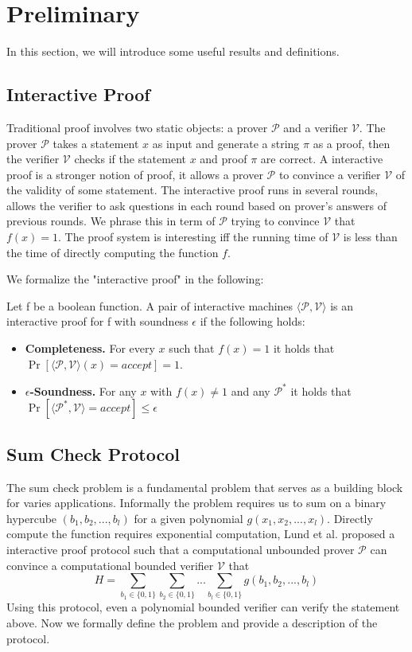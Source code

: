 \section{Preliminary}
In this section, we will introduce some useful results and definitions.
\subsection{Interactive Proof}
Traditional proof involves two static objects: a prover $\mathcal{P}$ and a verifier $\mathcal{V}$. The prover $\mathcal{P}$ takes a statement $x$ as input and generate a string $\pi$ as a proof, then the verifier $\mathcal{V}$ checks if the statement $x$ and proof $\pi$ are correct. A interactive proof is a stronger notion of proof, it allows a prover $\mathcal{P}$ to convince a verifier $\mathcal{V}$ of the validity of some statement. The interactive proof runs in several rounds, allows the verifier to ask questions in each round based on prover's answers of previous rounds. We phrase this in term of $\mathcal{P}$ trying to convince $\mathcal{V}$ that $f(x)=1$. The proof system is interesting iff the running time of $\mathcal{V}$ is less than the time of directly computing the function $f$.

We formalize the "interactive proof" in the following:	
\begin{definition}
	Let f be a boolean function. A pair of interactive machines $\langle\mathcal{P}, \mathcal{V}\rangle$ is an interactive proof for f with soundness $\epsilon$ if the following holds:
	\begin{itemize}
		\item {\bf Completeness.} For every $x$ such that $f(x) = 1$ it holds that $\Pr[\langle\mathcal{P}, \mathcal{V}\rangle(x)=accept]=1$.
		\item {\bf $\epsilon$-Soundness.} For any $x$ with $f(x) \neq 1$ and any $\mathcal{P}^*$ it holds that $\Pr[\langle\mathcal{P^*},\mathcal{V}\rangle=accept] \le \epsilon$
	\end{itemize}
\end{definition}

\subsection{Sum Check Protocol}
The sum check problem is a fundamental problem that serves as a building block for varies applications. Informally the problem requires us to sum on a binary hypercube $(b_1, b_2, ..., b_{l})$ for a given polynomial $g(x_1, x_2, ..., x_{l})$. Directly compute the function requires exponential computation, Lund et al.\cite{sumcheck} proposed a interactive proof protocol such that a computational unbounded prover $\mathcal{P}$ can convince a computational bounded verifier $\mathcal{V}$ that $$H=\sum_{b_1\in\{0,1\}}\sum_{b_2\in\{0,1\}}...\sum_{b_{l}\in\{0,1\}}g(b_1,b_2,...,b_{l})$$
Using this protocol, even a polynomial bounded verifier can verify the statement above. Now we formally define the problem and provide a description of the protocol.

